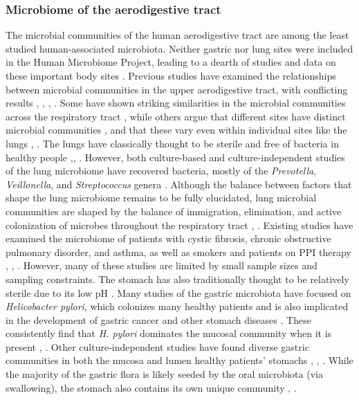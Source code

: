 \documentclass[12pt]{article}
\begin{document}
\subsubsection{Microbiome of the aerodigestive tract}
The microbial communities of the human aerodigestive tract are among the least 
studied human-associated microbiota. 
Neither gastric nor lung sites were included in the 
Human Microbiome Project, leading to a dearth of studies and data on 
these important body sites \cite{bassis-source-2015}. Previous studies have examined the relationships between microbial communities in  the upper 
aerodigestive tract, with conflicting results \cite{bassis-source-2015}, \cite{rosen-ppi-2015}, \cite{charslon-topographical-2011}, \cite{almomani-cf_sputum-2016}. 
Some have shown striking similarities in the microbial
communities across the respiratory tract \cite{almomani-cf_sputum-2016}, \cite{bassis-source-2015} while others
argue that different sites have distinct microbial communities \cite{rosen-ppi-2015},
and that these vary even within individual sites like the lungs \cite{erbdownward-copd-2011}, \cite{dickson-spatial-2015}. The lungs have classically thought to be sterile and free of bacteria in 
healthy people \cite{charslon-topographical-2011},\cite{bassis-source-2015}, \cite{beck-lung-2012}. 
However, both culture-based
and culture-independent studies of the lung microbiome have recovered
bacteria, mostly of the \textit{Prevotella}, \textit{Veillonella}, and \textit{Streptococcus} genera \cite{bassis-source-2015}. 
Although the balance between factors that shape the lung microbiome 
remains to be fully elucidated, lung microbial communities are shaped by the balance of
immigration, elimination, and active colonization of microbes 
throughout the respiratory tract \cite{bassis-source-2015}, \cite{dickson-lung_microbiome-2014}.
Existing studies have examined the microbiome of patients with cystic fibrosis, chronic obstructive 
pulmonary disorder, and asthma, as well as smokers and patients on PPI therapy \cite{almomani-cf_sputum-2016}, \cite{erbdownward-copd-2011}, \cite{rosen-ppi-2015}.
However, many of these studies are limited by small sample sizes and sampling constraints. The stomach has also traditionally thought to be
relatively sterile due to its low pH \cite{lawson-gastric-2010}.
Many studies of the gastric microbiota have focused on \textit{Helicobacter pylori}, 
which colonizes many healthy patients and is also implicated in the development of gastric cancer and other stomach diseases \cite{bik-stomach-2006}.
These consistently find that \textit{H. pylori} dominates the mucosal 
community when it is present \cite{bik-stomach-2006}, \cite{lawson-gastric-2010}.
Other culture-independent studies have found diverse gastric communities in 
both the mucosa and lumen healthy patients' stomachs \cite{bassis-source-2015}, \cite{rosen-ppi-2015}, \cite{lawson-gastric-2010}.
While the majority of the gastric flora is likely seeded by the
oral microbiota (via swallowing), 
the stomach also contains its own unique community \cite{bassis-source-2015}, \cite{lawson-gastric-2010}.
\end{document}
